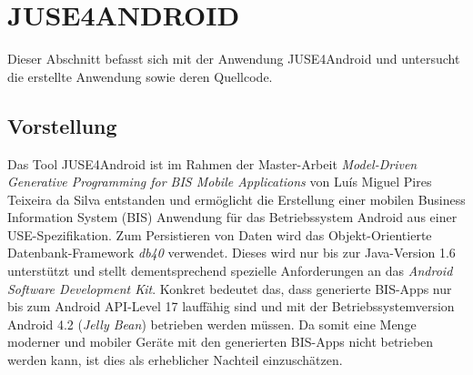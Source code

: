 \documentclass[a4paper,twoside]{article}
\begin{document}
\section{\uppercase{JUSE4Android}}
\label{JUSE4Android}
Dieser Abschnitt befasst sich mit der Anwendung JUSE4Android und untersucht die erstellte Anwendung sowie deren Quellcode. 



\subsection{Vorstellung}
Das Tool JUSE4Android ist im Rahmen der Master-Arbeit \textit{Model-Driven Generative Programming for BIS Mobile Applications} von Luís Miguel Pires Teixeira da Silva entstanden und ermöglicht die Erstellung einer mobilen Business Information System (BIS) Anwendung für das Betriebssystem Android aus einer USE-Spezifikation. Zum Persistieren von Daten wird das Objekt-Orientierte Datenbank-Framework \textit{db40} verwendet. Dieses wird nur bis zur Java-Version 1.6 unterstützt und stellt dementsprechend spezielle Anforderungen an das \textit{Android Software Development Kit}. Konkret bedeutet das, dass generierte BIS-Apps nur bis zum Android API-Level 17 lauffähig sind und mit der Betriebssystemversion Android 4.2 (\textit{Jelly Bean}) betrieben werden müssen. Da somit eine Menge moderner und mobiler Geräte mit den generierten BIS-Apps nicht betrieben werden kann, ist dies als erheblicher Nachteil einzuschätzen.
\end{document}
